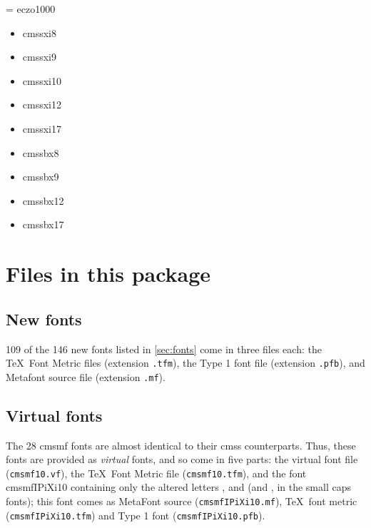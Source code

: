 \documentclass{amsart}
\begin{document}
\noindent{}\textwidth\parbox[t]{0.235\textwidth}{
\font\temp = eczo1000 \temp
\begin{itemize}[leftmargin=*]
\item \textsf{cmssxi8}
\item \textsf{cmssxi9}
\item \textsf{cmssxi10}
\end{itemize}
}\parbox[t]{0.235\textwidth}{
\begin{itemize}[leftmargin=*]
\item \textsf{cmssxi12}
\item \textsf{cmssxi17}
\end{itemize}
}\parbox[t]{0.235\textwidth}{
\begin{itemize}[leftmargin=*]
\item \textsf{cmssbx8}
\item \textsf{cmssbx9}
\end{itemize}
}\parbox[t]{0.235\textwidth}{
\begin{itemize}[leftmargin=*]
\item \textsf{cmssbx12}
\item \textsf{cmssbx17}
\end{itemize}
}


\section{Files in this package}\label{sec:files}

\subsection{New fonts}
109 of the 146 new fonts listed in \autoref{sec:fonts} come in three files each: the \TeX\ Font Metric files (extension \texttt{.tfm}), the Type 1 font file (extension \texttt{.pfb}), and Metafont source file (extension \texttt{.mf}).

\subsection{Virtual fonts}
The 28 \textsf{cmsmf} fonts are almost identical to their \textsf{cmss} counterparts. Thus, these fonts are provided as \emph{virtual} fonts, and so come in five parts: the virtual font file (\texttt{cmsmf10.vf}), the \TeX\ Font Metric file (\texttt{cmsmf10.tfm}), and the font \textsf{cmsmfIPiXi10} containing only the altered letters ,  and  (and , in the small caps fonts); this font comes as MetaFont source (\texttt{cmsmfIPiXi10.mf}), \TeX\ font metric (\texttt{cmsmfIPiXi10.tfm}) and Type 1 font (\texttt{cmsmfIPiXi10.pfb}).
\end{document}
